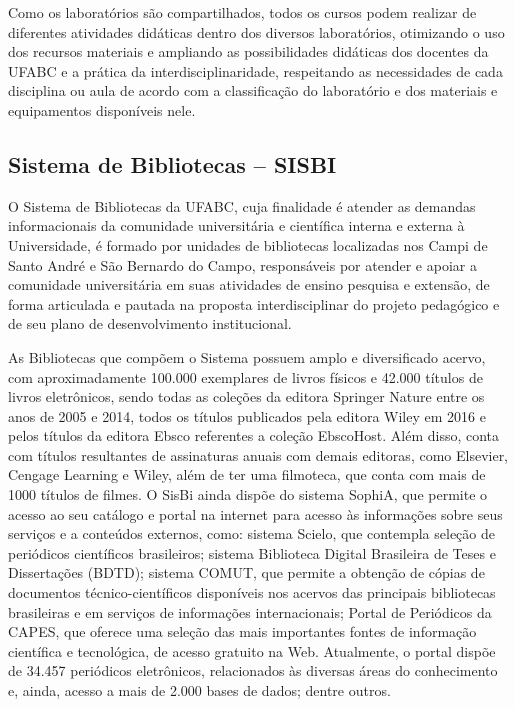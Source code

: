 Como os laboratórios são compartilhados, todos os cursos podem realizar de
diferentes atividades didáticas dentro dos diversos laboratórios, otimizando o
uso dos recursos materiais e ampliando as possibilidades didáticas dos docentes
da UFABC e a prática da interdisciplinaridade, respeitando as necessidades de
cada disciplina ou aula de acordo com a classificação do laboratório e dos
materiais e equipamentos disponíveis nele.

\subsection{Sistema de Bibliotecas – SISBI}

O Sistema de Bibliotecas da UFABC, cuja finalidade é atender as demandas
informacionais da comunidade universitária e científica interna e externa à
Universidade, é formado por unidades de bibliotecas localizadas nos Campi de
Santo André e São Bernardo do Campo, responsáveis por atender e apoiar a
comunidade universitária em suas atividades de ensino pesquisa e extensão, de
forma articulada e pautada na proposta interdisciplinar do projeto pedagógico e
de seu plano de desenvolvimento institucional.

As Bibliotecas que compõem o Sistema possuem amplo e diversificado acervo, com
aproximadamente 100.000 exemplares de livros físicos e 42.000 títulos de livros
eletrônicos, sendo todas as coleções da editora Springer Nature entre os anos
de 2005 e 2014, todos os títulos publicados pela editora Wiley em 2016 e
pelos títulos da editora Ebsco referentes a coleção EbscoHost. 
Além disso, conta com títulos resultantes de assinaturas anuais com demais
editoras, como Elsevier, Cengage Learning e Wiley, além de ter uma filmoteca,
que conta com mais de 1000 títulos de filmes.
O SisBi ainda dispõe do sistema SophiA, que permite o acesso ao seu catálogo e
portal na internet para acesso às informações sobre seus serviços e a conteúdos
externos, como: sistema Scielo, que contempla seleção de periódicos científicos
brasileiros; sistema Biblioteca Digital Brasileira de Teses e Dissertações
(BDTD); sistema COMUT, que permite a obtenção de cópias de documentos
técnico-científicos disponíveis nos acervos das principais bibliotecas
brasileiras e em serviços de informações internacionais; Portal de Periódicos
da CAPES, que oferece uma seleção das mais importantes fontes de informação
científica e tecnológica, de acesso gratuito na Web.
Atualmente, o portal dispõe de 34.457 periódicos eletrônicos, relacionados às
diversas áreas do conhecimento e, ainda, acesso a mais de 2.000 bases de dados;
dentre outros.

